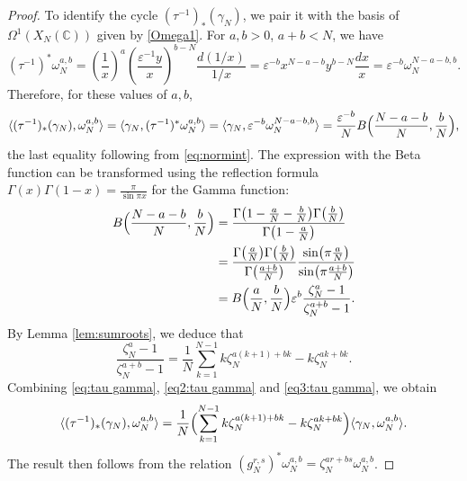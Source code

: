\documentclass[11pt,a4,leqno]{amsart}
\theoremstyle{my theoremstyle}
\theoremstyle{dfn}
\theoremstyle{remark}
\renewcommand{\1}{\mathbbm{1}}
\newcommand{\C}{\mathbb{C}}
\newcommand{\e}{\varepsilon}
\numberwithin{equation}{section}
\begin{document}
\begin{proof}
To identify the cycle $(\tau^{-1})_*(\gamma_N)$, we pair it with the basis of $\Omega^1(X_N(\C))$ given by \eqref{Omega1}. For $a,b>0$, $a+b<N$, we have
\begin{equation*}
    (\tau^{-1})^* \omega_N^{a, b} = \left(\dfrac1x\right)^a \left( \dfrac{\e^{-1} y}x\right)^{b-N} \dfrac{d(1/x)}{1/x} = \e^{-b} x^{N-a-b} y^{b-N} \dfrac{dx}{x}= \e^{-b} \omega_N^{N-a-b, b}.
\end{equation*}
Therefore, for these values of $a,b$,
\begin{equation}\label{eq:tau gamma}
    \langle (\tau^{-1})_*(\gamma_N), \omega_N^{a,b} \rangle = \langle \gamma_N, (\tau^{-1})^* \omega_N^{a,b} \rangle = \langle \gamma_N, \e^{-b} \omega_N^{N-a-b,b} \rangle = \frac{\e^{-b}}{N} B\Bigl(\frac{N-a-b}{N}, \frac{b}{N} \Bigr),
\end{equation}
the last equality following from \eqref{eq:normint}. The expression with the Beta function can be transformed using the reflection formula $\Gamma(x) \Gamma(1-x)= \frac{\pi}{\sin \pi x}$ for the Gamma function:
\begin{equation}\label{eq2:tau gamma}
\begin{split}
    B\Bigl(\frac{N-a-b}{N}, \frac{b}{N} \Bigr) & = \frac{\Gamma\bigl(1-\frac{a}{N}-\frac{b}{N}\bigr) \Gamma\bigl(\frac{b}{N}\bigr)}{\Gamma\bigl(1-\frac{a}{N}\bigr)} \\
    & = \frac{\Gamma\bigl(\frac{a}{N}\bigr) \Gamma\bigl(\frac{b}{N}\bigr)}{\Gamma\bigl(\frac{a+b}{N}\bigr)} \frac{\sin\bigl(\pi \frac{a}{N}\bigr)}{\sin\bigl(\pi \frac{a+b}{N}\bigr)} \\
    & = B\Bigl(\frac{a}{N}, \frac{b}{N}\Bigr) \e^b \frac{\zeta_N^a-1}{\zeta_N^{a+b}-1}.
\end{split}
\end{equation}
By Lemma \ref{lem:sumroots}, we deduce that
\begin{equation}\label{eq3:tau gamma}
    \frac{\zeta_N^a-1}{\zeta_N^{a+b}-1} = \frac{1}{N} \sum_{k=1}^{N-1} k \zeta_N^{a(k+1)+bk} - k \zeta_N^{ak+bk}.
\end{equation}
Combining \eqref{eq:tau gamma}, \eqref{eq2:tau gamma} and \eqref{eq3:tau gamma}, we obtain
\begin{equation*}
    \langle (\tau^{-1})_*(\gamma_N), \omega_N^{a,b} \rangle = \frac{1}{N} \Bigl(\sum_{k=1}^{N-1} k \zeta_N^{a(k+1)+bk} - k \zeta_N^{ak+bk}\Bigr) \langle \gamma_N, \omega_N^{a,b} \rangle.
\end{equation*}
The result then follows from the relation $(g_N^{r,s})^* \omega_N^{a,b} = \zeta_N^{ar+bs} \omega_N^{a,b}$.
\end{proof}
\end{document}

